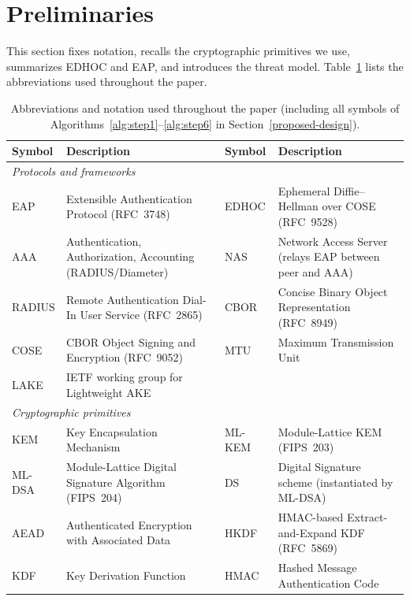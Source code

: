 \documentclass{easychair}
\begin{document}
\section{Preliminaries}
\label{pleminary}
This section fixes notation, recalls the cryptographic primitives we use,
summarizes EDHOC and EAP, and introduces the
threat model. Table~\ref{tab:abbr} lists the abbreviations used
throughout the paper.

\begin{table}[h]
\centering
\scriptsize
\caption{Abbreviations and notation used throughout the paper
(including all symbols of Algorithms~\ref{alg:step1}--\ref{alg:step6}
in Section~\ref{proposed-design}).}
\label{tab:abbr}
\setlength{\tabcolsep}{4pt}
\begin{tabularx}{\linewidth}{@{}l X l X@{}}
\toprule
\textbf{Symbol} & \textbf{Description} & \textbf{Symbol} & \textbf{Description} \\
\midrule
\multicolumn{4}{l}{\textit{Protocols and frameworks}} \\
EAP    & Extensible Authentication Protocol (RFC~3748) & EDHOC  & Ephemeral Diffie--Hellman over COSE (RFC~9528) \\
AAA    & Authentication, Authorization, Accounting (RADIUS/Diameter) & NAS    & Network Access Server (relays EAP between peer and AAA) \\
RADIUS & Remote Authentication Dial-In User Service (RFC~2865) & CBOR   & Concise Binary Object Representation (RFC~8949) \\
COSE   & CBOR Object Signing and Encryption (RFC~9052) & MTU    & Maximum Transmission Unit \\
LAKE   & IETF working group for Lightweight AKE & & \\
\midrule
\multicolumn{4}{l}{\textit{Cryptographic primitives}} \\
KEM    & Key Encapsulation Mechanism & ML-KEM & Module-Lattice KEM (FIPS~203) \\
ML-DSA & Module-Lattice Digital Signature Algorithm (FIPS~204) & DS     & Digital Signature scheme (instantiated by ML-DSA) \\
AEAD   & Authenticated Encryption with Associated Data & HKDF   & HMAC-based Extract-and-Expand KDF (RFC~5869) \\
KDF    & Key Derivation Function & HMAC   & Hashed Message Authentication Code \\

\end{tabularx}
\end{table}
\end{document}
